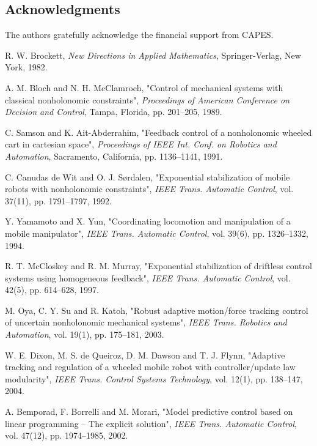\documentclass[twocolumn]{IEEEtran} %
\begin{document}
\subsection*{Acknowledgments}
The authors gratefully acknowledge the financial support from CAPES.


\begin{thebibliography}{}

R. W. Brockett, 
{\em New Directions in Applied Mathematics},
Springer-Verlag, New York, 1982.

A. M. Bloch and N. H. McClamroch,
"Control of mechanical systems with classical nonholonomic constraints",
{\em Proceedings of American Conference on Decision and Control\/}, Tampa, Florida, pp. 201--205, 1989.

C. Samson and K. Ait-Abderrahim,
"Feedback control of a nonholonomic wheeled cart in cartesian space",
{\em Proceedings of IEEE Int. Conf. on Robotics and Automation\/}, Sacramento, California, pp. 1136--1141, 1991.

C. Canudas de Wit and O. J. S\o rdalen, 
"Exponential stabilization of mobile robots with nonholonomic constraints",
{\em IEEE Trans. Automatic Control\/}, vol. 37(11), pp. 1791--1797, 1992.

Y. Yamamoto and X. Yun, 
"Coordinating locomotion and manipulation of a mobile manipulator",
{\em IEEE Trans. Automatic Control\/}, vol. 39(6), pp. 1326--1332, 1994.

R. T. McCloskey and R. M. Murray, 
"Exponential stabilization of driftless control systems using homogeneous feedback",
{\em IEEE Trans. Automatic Control\/}, vol. 42(5), pp. 614--628, 1997.

M. Oya, C. Y. Su and R. Katoh, 
"Robust adaptive motion/force tracking control of uncertain nonholonomic mechanical systems",
{\em IEEE Trans. Robotics and Automation\/}, vol. 19(1), pp. 175--181, 2003.

W. E. Dixon, M. S. de Queiroz, D. M. Dawson and T. J. Flynn, 
"Adaptive tracking and regulation of a wheeled mobile robot with controller/update law modularity",
{\em IEEE Trans. Control Systems Technology\/}, vol. 12(1), pp. 138--147, 2004.

A. Bemporad, F. Borrelli and M. Morari, 
"Model predictive control based on linear programming -- The explicit solution",
{\em IEEE Trans. Automatic Control\/}, vol. 47(12), pp. 1974--1985, 2002.


\end{thebibliography}
\end{document}

